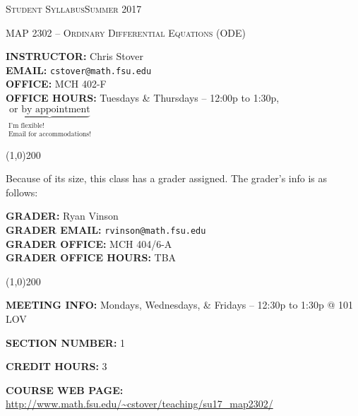 \documentclass[12pt,oneside]{amsart}
\begin{document}
\centerline{\large\textsc{Student Syllabus\hspace{6mm}Summer 2017}}\vspace{1.5mm}
\centerline{\large\hfill\textsc{MAP 2302 -- Ordinary Differential Equations (ODE)}\hfill}\vspace{3mm}
 
\noindent \textbf{INSTRUCTOR:} Chris Stover\\[1.5mm]
\noindent \textbf{EMAIL:} \texttt{cstover@math.fsu.edu}\\[1.5mm]
\noindent \textbf{OFFICE:} MCH 402-F\\[1.5mm]
\noindent \textbf{OFFICE HOURS:} Tuesdays \& Thursdays -- 12:00p to 1:30p, $\underbrace{\text{or by appointment}}_{\substack{\text{I'm flexible!}\\\text{Email for accommodations!}}}$%

\vspace{-1.25mm}
\begin{center}
	\line(1,0){200}
\end{center}
\vspace{-1.75mm}
\noindent Because of its size, this class has a grader assigned. The grader's info is as follows:

\noindent \textbf{GRADER:} Ryan Vinson\\[1.5mm]
\noindent \textbf{GRADER EMAIL:} \texttt{rvinson@math.fsu.edu}\\[1.5mm]
\noindent \textbf{GRADER OFFICE:} MCH 404/6-A\\[1.5mm]
\noindent \textbf{GRADER OFFICE HOURS:} TBA

\vspace{-4.5mm}
\begin{center}
	\line(1,0){200}
\end{center}
\vspace{-1.75mm}

\noindent \textbf{MEETING INFO:} Mondays, Wednesdays, \& Fridays -- 12:30p to 1:30p @ 101 LOV

\noindent \textbf{SECTION NUMBER:} 1%

\noindent \textbf{CREDIT HOURS:} 3

\noindent \textbf{COURSE WEB PAGE:} \url{http://www.math.fsu.edu/~cstover/teaching/su17_map2302/}%
\end{document}
